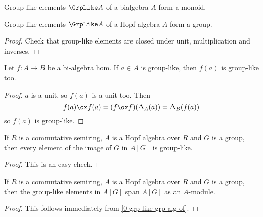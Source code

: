 \begin{proposition}
  \label{0-grp-like-grp}
  \leanok

  Group-like elements $\GrpLike A$ of a bialgebra $A$ form a monoid.

  Group-like elements $\GrpLike A$ of a Hopf algebra $A$ form a group.
\end{proposition}
\begin{proof}
  \uses{}
  \leanok

  Check that group-like elements are closed under unit, multiplication and inverses.
\end{proof}


\begin{lemma}
  \label{0-grp-like-map}
  \leanok

  Let $f : A \to B$ be a bi-algebra hom. If $a \in A$ is group-like, then $f(a)$ is group-like too.
\end{lemma}
\begin{proof}
  \uses{}
  \leanok

  $a$ is a unit, so $f(a)$ is a unit too. Then
  \[
    f(a) \ox f(a) = (f \ox f)(\Delta_A(a)) = \Delta_B(f(a))
  \]
  so $f(a)$ is group-like.
\end{proof}


\begin{lemma}
  \label{0-grp-like-grp-alg-of}
  \leanok

  If $R$ is a commutative semiring, $A$ is a Hopf algebra over $R$ and
  $G$ is a group, then every element of the image of $G$ in $A[G]$ is group-like.
\end{lemma}
\begin{proof}
  \uses{}
  \leanok

  This is an easy check.
\end{proof}


\begin{lemma}
  \label{0-grp-like-grp-alg-span}
  \leanok

  If $R$ is a commutative semiring, $A$ is a Hopf algebra over $R$ and
  $G$ is a group, then the group-like elements in $A[G]$ span $A[G]$ as
  an $A$-module.

\end{lemma}
\begin{proof}
  \leanok

  This follows immediately from \ref{0-grp-like-grp-alg-of}.
\end{proof}


